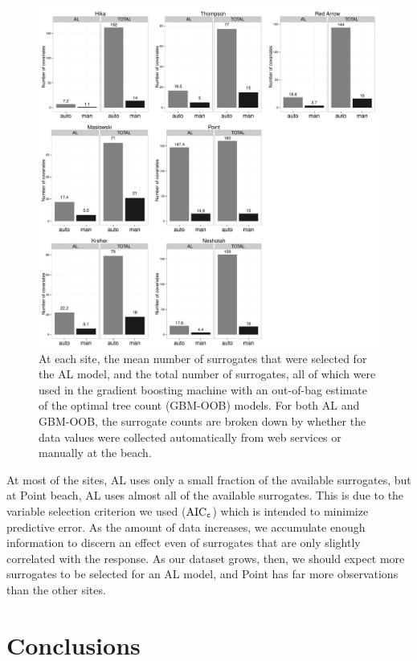 \documentclass[authoryear,review, 12pt]{elsarticle}
\begin{document}
\begin{figure}
\includegraphics[width=\textwidth]{fig5/covariate-count.PDF}
\caption{At each site, the mean number of surrogates that were selected
for the AL model, and the total number of surrogates, all of which were
used in the gradient boosting machine with an out-of-bag estimate of the
optimal tree count (GBM-OOB) models. For both AL and GBM-OOB, the
surrogate counts are broken down by whether the data values were
collected automatically from web services or manually at the beach.}
\end{figure}

At most of the sites, AL uses only a small fraction of the available
surrogates, but at Point beach, AL uses almost all of the available
surrogates. This is due to the variable selection criterion we used
(\(\text{AIC}_{\tt c}\)) which is intended to minimize predictive error.
As the amount of data increases, we accumulate enough information to
discern an effect even of surrogates that are only slightly correlated
with the response. As our dataset grows, then, we should expect more
surrogates to be selected for an AL model, and Point has far more
observations than the other sites.

\section{Conclusions}\label{discussion}
\end{document}
